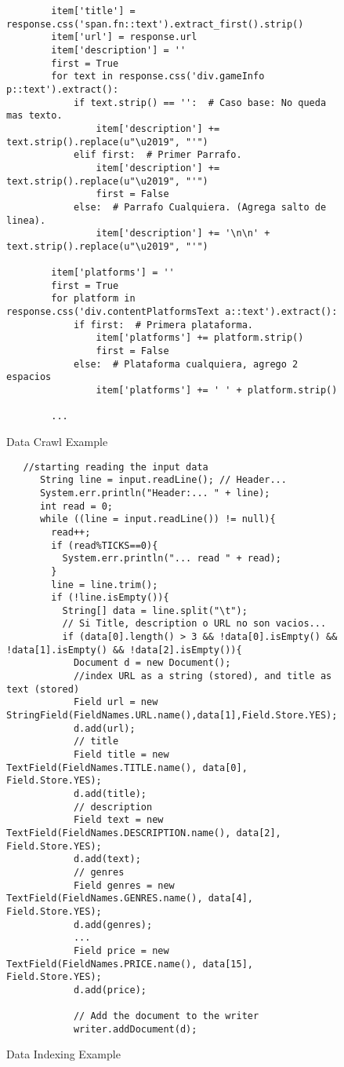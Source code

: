 \documentclass{article}
\begin{document}
\begin{figure}[h]
\begin{verbatim}
        item['title'] = response.css('span.fn::text').extract_first().strip()
        item['url'] = response.url
        item['description'] = ''
        first = True
        for text in response.css('div.gameInfo p::text').extract():
            if text.strip() == '':  # Caso base: No queda mas texto.
                item['description'] += text.strip().replace(u"\u2019", "'")
            elif first:  # Primer Parrafo.
                item['description'] += text.strip().replace(u"\u2019", "'")
                first = False
            else:  # Parrafo Cualquiera. (Agrega salto de linea).
                item['description'] += '\n\n' + text.strip().replace(u"\u2019", "'")

        item['platforms'] = ''
        first = True
        for platform in response.css('div.contentPlatformsText a::text').extract():
            if first:  # Primera plataforma.
                item['platforms'] += platform.strip()
                first = False
            else:  # Plataforma cualquiera, agrego 2 espacios
                item['platforms'] += ' ' + platform.strip()

        ...
\end{verbatim}
\caption{Data Crawl Example}
\label{f:tcode}
\end{figure}


\begin{figure}[h]
\begin{verbatim}
   //starting reading the input data
      String line = input.readLine(); // Header...
      System.err.println("Header:... " + line);
      int read = 0;
      while ((line = input.readLine()) != null){
        read++;
        if (read%TICKS==0){
          System.err.println("... read " + read);
        }
        line = line.trim();
        if (!line.isEmpty()){
          String[] data = line.split("\t"); 
          // Si Title, description o URL no son vacios...
          if (data[0].length() > 3 && !data[0].isEmpty() && !data[1].isEmpty() && !data[2].isEmpty()){  
            Document d = new Document();
            //index URL as a string (stored), and title as text (stored)
            Field url = new StringField(FieldNames.URL.name(),data[1],Field.Store.YES);
            d.add(url);
            // title
            Field title = new TextField(FieldNames.TITLE.name(), data[0], Field.Store.YES);
            d.add(title);
            // description
            Field text = new TextField(FieldNames.DESCRIPTION.name(), data[2], Field.Store.YES);
            d.add(text);
            // genres
            Field genres = new TextField(FieldNames.GENRES.name(), data[4], Field.Store.YES);
            d.add(genres);
            ...
            Field price = new TextField(FieldNames.PRICE.name(), data[15], Field.Store.YES);
            d.add(price);
            
            // Add the document to the writer
            writer.addDocument(d);
\end{verbatim}
\caption{Data Indexing Example}
\label{f:tcode}
\end{figure}
\end{document}
